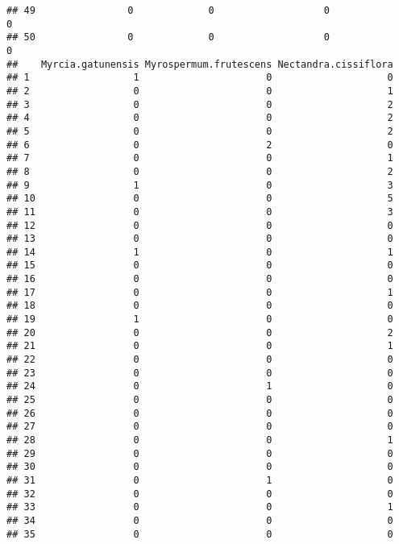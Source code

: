 \documentclass[
]{article}
\begin{document}
\begin{verbatim}
## 49                0             0                   0                   0
## 50                0             0                   0                   0
##    Myrcia.gatunensis Myrospermum.frutescens Nectandra.cissiflora
## 1                  1                      0                    0
## 2                  0                      0                    1
## 3                  0                      0                    2
## 4                  0                      0                    2
## 5                  0                      0                    2
## 6                  0                      2                    0
## 7                  0                      0                    1
## 8                  0                      0                    2
## 9                  1                      0                    3
## 10                 0                      0                    5
## 11                 0                      0                    3
## 12                 0                      0                    0
## 13                 0                      0                    0
## 14                 1                      0                    1
## 15                 0                      0                    0
## 16                 0                      0                    0
## 17                 0                      0                    1
## 18                 0                      0                    0
## 19                 1                      0                    0
## 20                 0                      0                    2
## 21                 0                      0                    1
## 22                 0                      0                    0
## 23                 0                      0                    0
## 24                 0                      1                    0
## 25                 0                      0                    0
## 26                 0                      0                    0
## 27                 0                      0                    0
## 28                 0                      0                    1
## 29                 0                      0                    0
## 30                 0                      0                    0
## 31                 0                      1                    0
## 32                 0                      0                    0
## 33                 0                      0                    1
## 34                 0                      0                    0
## 35                 0                      0                    0

\end{verbatim}
\end{document}
